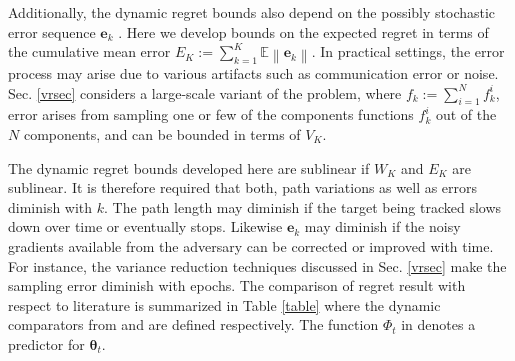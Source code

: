 \documentclass[draftcls,onecolumn,12pt]{IEEEtran}
\theoremstyle{plain}
\def\x{\mathbf{x}}
\def\e{\mathbf{e}}
\def\EE{\mathbb{E}}
\providecommand{\norm}[1]{\left\|#1\right\|}
\theoremstyle{plain}
\theoremstyle{remark}
\begin{document}
Additionally, the dynamic regret bounds also depend on the possibly stochastic error sequence $\e_k$ \cite{bedi2018tracking}. Here we develop bounds on the expected regret in terms of the cumulative mean error $E_K:=\sum_{k=1}^K \EE\norm{\e_k}$. In practical settings, the error process may arise due to various artifacts such as communication error or noise. Sec. \ref{vrsec} considers a large-scale variant of the problem, where $f_k:=\sum_{i=1}^N f_k^i$, error arises from sampling one or few of the components functions $f_k^i$ out of the $N$ components, and can be bounded in terms of $V_K$. 

The dynamic regret bounds developed here are sublinear if $W_K$ and $E_K$ are sublinear. It is therefore required that both, path variations as well as errors diminish with $k$. The path length may diminish if the target being tracked slows down over time or eventually stops. Likewise $\e_k$ may diminish if the noisy gradients available from the adversary can be corrected or improved with time. For instance, the variance reduction techniques discussed in Sec. \ref{vrsec} make the sampling error diminish with epochs. The comparison of regret result with respect to literature is summarized in Table \ref{table} where the dynamic comparators from \cite{zhang2016improved} and \cite{hall2015online} are defined respectively. The function $\Phi_t$ in \cite{hall2015online} denotes a predictor for $\boldsymbol{\theta}_t$. 







 
\end{document}
